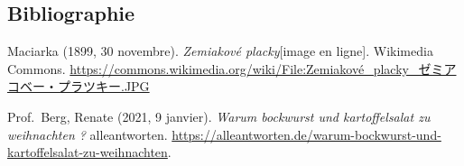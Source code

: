 \documentclass[12pt,french,letterpaper]{article}
\begin{document}
{\newpage

\hypertarget{bibliographie}{%
\subsection{Bibliographie}\label{bibliographie}}

Maciarka (1899, 30 novembre). \emph{Zemiakové placky}{[}image en
ligne{]}. Wikimedia Commons.
\url{https://commons.wikimedia.org/wiki/File:Zemiakové_placky_ゼミアコベー・プラツキー.JPG}

Prof.~Berg, Renate (2021, 9 janvier). \emph{Warum bockwurst und
kartoffelsalat zu weihnachten ?} alleantworten.
\url{https://alleantworten.de/warum-bockwurst-und-kartoffelsalat-zu-weihnachten}.}
\end{document}
